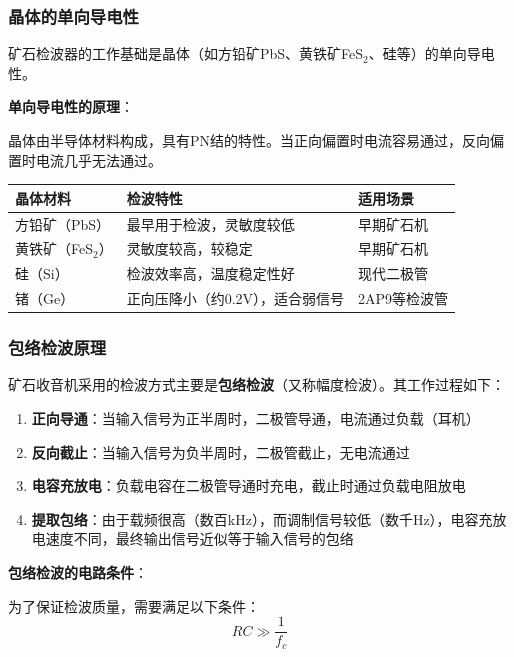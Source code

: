 \subsubsection{晶体的单向导电性}
\label{sec:crystal_unidirectional}

矿石检波器的工作基础是晶体（如方铅矿PbS、黄铁矿FeS$_2$、硅等）的单向导电性。

\textbf{单向导电性的原理}：

晶体由半导体材料构成，具有PN结的特性。当正向偏置时电流容易通过，反向偏置时电流几乎无法通过。

\begin{center}
\begin{tabular}{|p{3cm}|p{5cm}|p{4cm}|}
\hline
\textbf{晶体材料} & \textbf{检波特性} & \textbf{适用场景} \\
\hline
方铅矿（PbS） & 最早用于检波，灵敏度较低 & 早期矿石机 \\
黄铁矿（FeS$_2$） & 灵敏度较高，较稳定 & 早期矿石机 \\
硅（Si） & 检波效率高，温度稳定性好 & 现代二极管 \\
锗（Ge） & 正向压降小（约0.2V），适合弱信号 & 2AP9等检波管 \\
\hline
\end{tabular}
\end{center}

\subsubsection{包络检波原理}
\label{sec:envelope_detection}

矿石收音机采用的检波方式主要是\textbf{包络检波}（又称幅度检波）。其工作过程如下：

\begin{enumerate}
    \item \textbf{正向导通}：当输入信号为正半周时，二极管导通，电流通过负载（耳机）
    \item \textbf{反向截止}：当输入信号为负半周时，二极管截止，无电流通过
    \item \textbf{电容充放电}：负载电容在二极管导通时充电，截止时通过负载电阻放电
    \item \textbf{提取包络}：由于载频很高（数百kHz），而调制信号较低（数千Hz），电容充放电速度不同，最终输出信号近似等于输入信号的包络
\end{enumerate}

\textbf{包络检波的电路条件}：

为了保证检波质量，需要满足以下条件：
\begin{equation}
RC \gg \frac{1}{f_c}
\end{equation}

